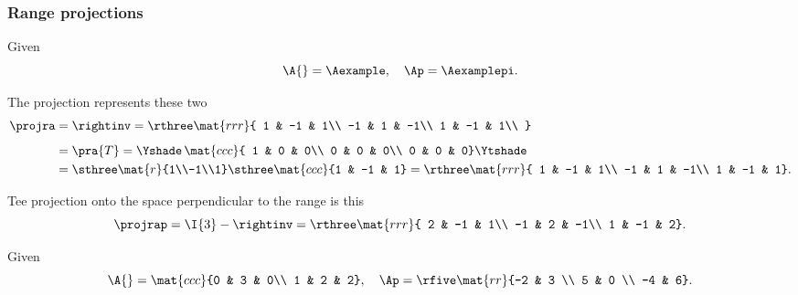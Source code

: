 \subsubsection{Range projections}
Given 
\begin{equation}
  \A{} = \Aexample, \quad \Ap = \Aexamplepi.
\end{equation}

The projection represents these two 
\begin{equation}
  \begin{split}
    \projra &= \rightinv = \rthree
    \mat{rrr}
    { 
    1 & -1 &  1\\
   -1 &  1 & -1\\
    1 & -1 &  1\\
    }\\[5pt]
    & = \pra{T} =
    \Yshade\,
    \mat{ccc}{
    1 & 0 & 0\\
    0 & 0 & 0\\
    0 & 0 & 0}
    \Ytshade\\
    & =\sthree
    \mat{r}
    {1\\-1\\1}
    \sthree
    \mat{ccc}
    {1 & -1 & 1}
    = \rthree\mat{rrr}
    { 1 & -1 &  1\\
     -1 &  1 & -1\\
      1 & -1 &  1}.
  \end{split}
\end{equation}

Tee projection onto the space perpendicular to the range is this
\begin{equation}
  \projrap = \I{3} - \rightinv = \rthree
    \mat{rrr}
    { 2 & -1 &  1\\
     -1 &  2 & -1\\
      1 & -1 &  2}.
\end{equation}

Given 
\begin{equation}
  \A{} = 
  \mat{ccc}
  {0 & 3 & 0\\
   1 & 2 & 2}
   , \quad \Ap = \rfive
   \mat{rr}
   {-2 & 3 \\ 5 & 0 \\ -4 & 6}.
\end{equation}

